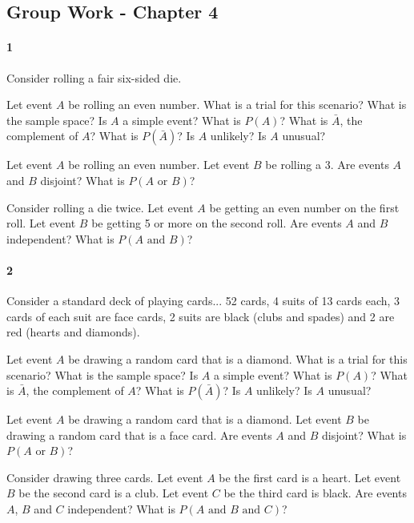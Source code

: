 \documentclass{article}
\begin{document}
\begin{flushleft}
\section*{Group Work - Chapter 4}
\paragraph{1} Consider rolling a fair six-sided die.
\begin{enumalpha}
\item Let event $A$ be rolling an even number. What is a trial for this scenario? What is the sample space? Is $A$ a simple event? What is $P(A)$? What is $\bar A$, the complement of $A$? What is $P(\bar A)$? Is $A$ unlikely? Is $A$ unusual?
\vspace{2.5in}
\item Let event $A$ be rolling an even number. Let event $B$ be rolling a 3. Are events $A$ and $B$ disjoint? What is $P(A \text{ or } B)$?
\vspace{2.5in}
\item Consider rolling a die twice. Let event $A$ be getting an even number on the first roll. Let event $B$ be getting 5 or more on the second roll. Are events $A$ and $B$ independent? What is $P(A \text { and } B)$?
\end{enumalpha}

\newpage
\paragraph{2} Consider a standard deck of playing cards... 52 cards, 4 suits of 13 cards each, 3 cards of each suit are face cards, 2 suits are black (clubs and spades) and 2 are red (hearts and diamonds).
\begin{enumalpha}
\item Let event $A$ be drawing a random card that is a diamond. What is a trial for this scenario? What is the sample space? Is $A$ a simple event? What is $P(A)$? What is $\bar A$, the complement of $A$? What is $P(\bar A)$? Is $A$ unlikely? Is $A$ unusual?
\vspace{2.5in}
\item Let event $A$ be drawing a random card that is a diamond. Let event $B$ be drawing a random card that is a face card. Are events $A$ and $B$ disjoint? What is $P(A \text{ or } B)$?
\vspace{2.5in}
\item Consider drawing three cards. Let event $A$ be the first card is a heart. Let event $B$ be the second card is a club. Let event $C$ be the third card is black. Are events $A$, $B$ and $C$ independent? What is $P(A \text { and } B \text { and } C)$?


\end{enumalpha}
\end{flushleft}
\end{document}
